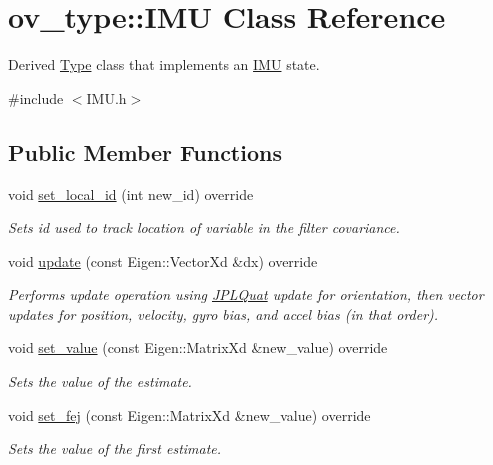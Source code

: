 \hypertarget{classov__type_1_1IMU}{}\section{ov\+\_\+type\+:\+:I\+MU Class Reference}
\label{classov__type_1_1IMU}


Derived \hyperlink{classov__type_1_1Type}{Type} class that implements an \hyperlink{classov__type_1_1IMU}{I\+MU} state.  




{\ttfamily \#include $<$I\+M\+U.\+h$>$}

\subsection*{Public Member Functions}
\begin{DoxyCompactItemize}
\item 
void \hyperlink{classov__type_1_1IMU_a9d4e915d474e8e13591a11a54ac7c969}{set\+\_\+local\+\_\+id} (int new\+\_\+id) override
\begin{DoxyCompactList}\small\item\em Sets id used to track location of variable in the filter covariance. \end{DoxyCompactList}\item 
void \hyperlink{classov__type_1_1IMU_ac40233687ffc481f5d4d1ebaaf882577}{update} (const Eigen\+::\+Vector\+Xd \&dx) override
\begin{DoxyCompactList}\small\item\em Performs update operation using \hyperlink{classov__type_1_1JPLQuat}{J\+P\+L\+Quat} update for orientation, then vector updates for position, velocity, gyro bias, and accel bias (in that order). \end{DoxyCompactList}\item 
void \hyperlink{classov__type_1_1IMU_a53586b4f92ba0110c2b2241fa26862a1}{set\+\_\+value} (const Eigen\+::\+Matrix\+Xd \&new\+\_\+value) override
\begin{DoxyCompactList}\small\item\em Sets the value of the estimate. \end{DoxyCompactList}\item 
void \hyperlink{classov__type_1_1IMU_aadf4a83a2371984898ca8c6a339617ce}{set\+\_\+fej} (const Eigen\+::\+Matrix\+Xd \&new\+\_\+value) override
\begin{DoxyCompactList}\small\item\em Sets the value of the first estimate. \end{DoxyCompactList}\item 

\end{DoxyCompactItemize}
